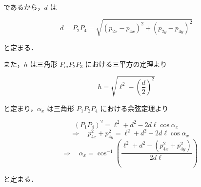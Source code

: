 であるから，$d$ は

\[
d = P_2P_4 = \sqrt{(p_{2x} - p_{4x})^2 + (p_{2y} - p_{4y})^2}
\tag{2.35}
\]

と定まる．

また，$h$ は三角形 $P_m P_2 P_3$ における三平方の定理より

\[
h = \sqrt{\ell^2 - \left( \dfrac{d}{2} \right)^2}
\tag{2.36}
\]

と定まり，$\alpha_x$ は三角形 $P_1 P_2 P_4$ における余弦定理より

\[
(P_1P_4)^2 = \ell^2 + d^2 - 2d\ell \cos\alpha_x
\]
\[
\quad \Rightarrow \quad
p_{4x}^2 + p_{4y}^2 = \ell^2 + d^2 - 2d\ell \cos\alpha_x
\]
\[
\quad \Rightarrow \quad
\alpha_x = \cos^{-1} \left( \dfrac{\ell^2 + d^2 - (p_{4x}^2 + p_{4y}^2)}{2d\ell} \right)
\tag{2.37}
\]

と定まる．

        